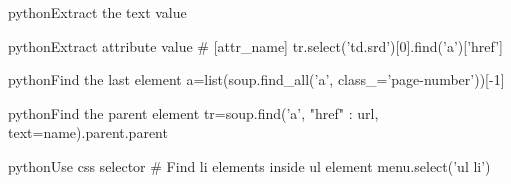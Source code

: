 \documentclass[10pt,a4paper]{article}
\begin{document}
\begin{multicols}{3}
\begin{codebox}{python}{Extract the text value}
\end{codebox}

\begin{codebox}{python}{Extract attribute value}
# [attr_name]
tr.select('td.srd')[0].find('a')['href']

\end{codebox}

\begin{codebox}{python}{Find the last element}
a=list(soup.find_all('a', class_='page-number'))[-1]

\end{codebox}

\begin{codebox}{python}{Find the parent element}
tr=soup.find('a', {"href" : url}, text=name).parent.parent

\end{codebox}

\begin{codebox}{python}{Use css selector}
# Find li elements inside ul element
menu.select('ul li')

\end{codebox}


\AtNextBibliography{\footnotesize}
\printbibliography  
\end{multicols}
\end{document}
